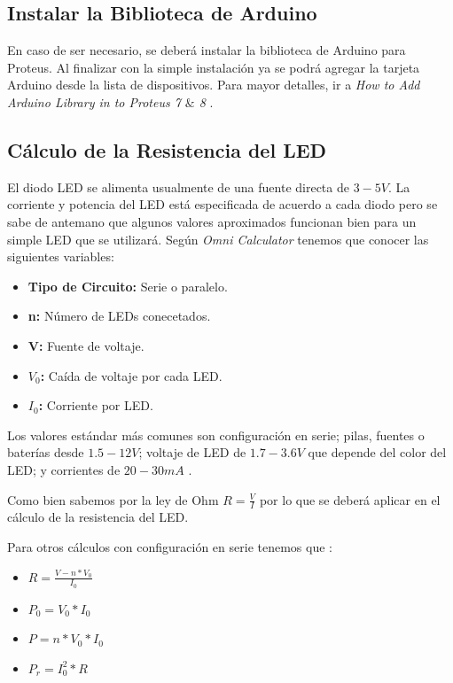 \documentclass{article}
\begin{document}
\subsection{Instalar la Biblioteca de Arduino}

En caso de ser necesario, se deberá instalar la biblioteca de Arduino para Proteus. Al finalizar con la simple instalación ya se podrá agregar la tarjeta Arduino desde la lista de dispositivos. Para mayor detalles, ir a \textit{How to Add Arduino Library in to Proteus 7 $\&$ 8} \cite{instructables-2018}.

\subsection{Cálculo de la Resistencia del LED}

El diodo LED se alimenta usualmente de una fuente directa de $3-5V$. La corriente y potencia del LED está especificada de acuerdo a cada diodo pero se sabe de antemano que algunos valores aproximados funcionan bien para un simple LED que se utilizará. Según \textit{Omni Calculator} \cite{szyk-2022} tenemos que conocer las siguientes variables:

\begin{itemize}
    \item \textbf{Tipo de Circuito:} Serie o paralelo.
    \item \textbf{n:} Número de LEDs conecetados.
    \item \textbf{V:} Fuente de voltaje.
    \item \textbf{$V_0$:} Caída de voltaje por cada LED.
    \item \textbf{$I_0$:} Corriente por LED.
\end{itemize}

Los valores estándar más comunes son configuración en serie; pilas, fuentes o baterías desde $1.5-12V$; voltaje de LED de $1.7-3.6V$ que depende del color del LED; y corrientes de $20-30mA$ \cite{szyk-2022}.

\bigbreak

Como bien sabemos por la ley de Ohm $R = \frac{V}{I}$ por lo que se deberá aplicar en el cálculo de la resistencia del LED.

\bigbreak

Para otros cálculos con configuración en serie tenemos que \cite{szyk-2022}:

\begin{itemize}
    \item $R = \frac{V - n*V_0}{I_0}$
    \item $P_0 = V_0 * I_0$
    \item $P = n * V_0 * I_0$
    \item $P_r = I_0^2 * R$
\end{itemize}
\end{document}
